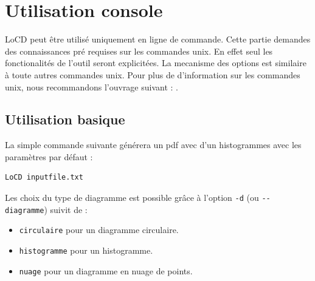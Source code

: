 \chapter{Utilisation console}

\renewcommand{\labelitemi}{$\bullet$} %

LoCD peut être utilisé uniquement en ligne de commande. Cette partie demandes des connaissances pré requises sur les commandes unix. En effet seul les fonctionalités de l'outil seront explicitées. La mecanisme des options est similaire à toute autres commandes unix. Pour plus de d'information sur les commandes unix, nous recommandons l'ouvrage suivant : \cite{linux}.


\section{Utilisation basique}
\label{sec:usebas}
La simple commande suivante générera un pdf avec d'un histogrammes avec les paramètres par défaut : %
\begin{verbatim}LoCD inputfile.txt\end{verbatim}Les choix du type de diagramme est possible grâce à l'option \verb+-d+ (ou \verb+--diagramme+) suivit de : 
\begin{itemize}
\item
\verb+circulaire+ pour un diagramme circulaire.
\item
\verb+histogramme+ pour un histogramme.
\item
\verb+nuage+ pour un diagramme en nuage de points.
\end{itemize}


